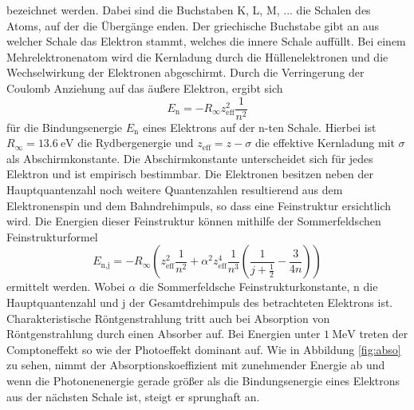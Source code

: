  bezeichnet werden. Dabei sind die Buchstaben K, L, M, ... die Schalen des Atoms, auf der die Übergänge enden. Der griechische Buchstabe gibt an aus welcher Schale das Elektron stammt, welches die innere Schale auffüllt.
 Bei einem Mehrelektronenatom wird die Kernladung durch die Hüllenelektronen und die Wechselwirkung der Elektronen abgeschirmt. Durch die Verringerung der Coulomb Anziehung auf das äußere Elektron, ergibt sich 
 \begin{equation}
     E_\text{n}=-R_{\infty} z_\text{eff}^2 \frac{1}{n^2}
     \label{eqn:Bindungse}
 \end{equation}
 für die Bindungsenergie $E_\text{n}$ eines Elektrons auf der n-ten Schale. Hierbei ist $R_{\infty}=\SI{13.6}{\electronvolt}$ die Rydbergenergie und $z_\text{eff}=z - \sigma$ die effektive Kernladung mit $\sigma$ als Abschirmkonstante.
 Die Abschirmkonstante unterscheidet sich für jedes Elektron und ist  empirisch bestimmbar. Die Elektronen besitzen neben der Hauptquantenzahl noch weitere Quantenzahlen resultierend aus dem Elektronenspin und dem Bahndrehimpuls, so dass eine Feinstruktur ersichtlich wird.
 Die Energien dieser Feinstruktur können mithilfe der Sommerfeldschen Feinstrukturformel 
 \begin{equation}
     E_\text{n,j}=-R_{\infty} \left(z_\text{eff}^2 \frac{1}{n^2} + \alpha^2 z_\text{eff}^4 \frac{1}{n^3} \left(\frac{1}{j+\frac{1}{2}} - \frac{3}{4n}\right) \right)
     \label{eqn:sommerfeld}
 \end{equation}
ermittelt werden. Wobei $\alpha$ die Sommerfeldsche Feinstrukturkonstante, n die Hauptquantenzahl und j der Gesamtdrehimpuls des betrachteten Elektrons ist.
\\
Charakteristische Röntgenstrahlung tritt auch bei Absorption von Röntgenstrahlung durch einen Absorber auf. Bei Energien unter $\SI{1}{\mega \electronvolt}$
treten der Comptoneffekt so wie der Photoeffekt dominant auf. Wie in Abbildung \ref{fig:abso} zu sehen, nimmt der Absorptionskoeffizient mit zunehmender Energie ab und wenn die Photonenenergie gerade größer als die Bindungsenergie eines Elektrons aus der nächsten Schale ist, steigt er sprunghaft an.
